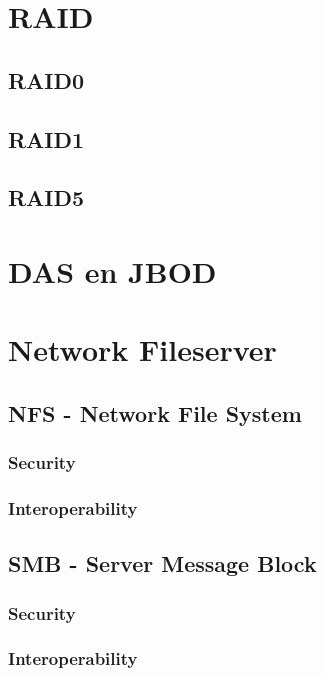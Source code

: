 \documentclass[a4paper,12pt,twoside,openright,titlepage]{book}
\begin{document}
\chapter{RAID}

\section{RAID0}

\section{RAID1}

\section{RAID5}


\chapter{DAS en JBOD}


\chapter{Network Fileserver}

\section{NFS - Network File System}

\subsection{Security}

\subsection{Interoperability}

\section{SMB - Server Message Block}

\subsection{Security}

\subsection{Interoperability}

\end{document}
